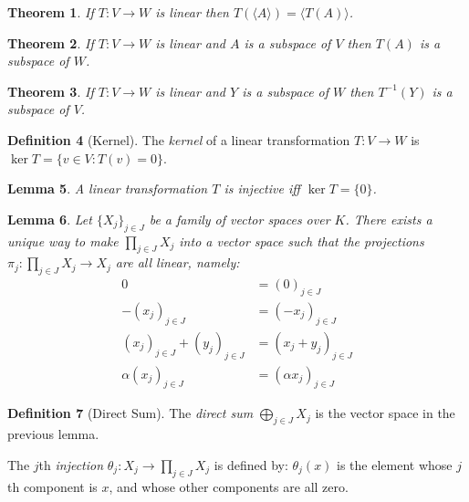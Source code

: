 \documentclass{book}
\newtheorem{lm}{Lemma}[chapter]
\newtheorem{thm}[lm]{Theorem}
\theoremstyle{definition}
\newtheorem{df}[lm]{Definition}
\newcommand{\inv}[1]{\ensuremath{{#1}^{-1}}}
\begin{document}
  \begin{thm}
    If $T : V \rightarrow W$ is linear then $T(\langle A \rangle) = \langle 
    T(A) 
    \rangle$.
  \end{thm}
  
  \begin{thm}
    If $T : V \rightarrow W$ is linear and $A$ is a subspace of $V$ then $T(A)$ 
    is a subspace of $W$.
  \end{thm}
  
  \begin{thm}
    If $T : V \rightarrow W$ is linear and $Y$ is a subspace of $W$ then 
    $\inv{T}(Y)$ is a subspace of $V$.
  \end{thm}
  
  \begin{df}[Kernel]
    The \emph{kernel} of a linear transformation $T : V \rightarrow W$ is $\ker 
    T 
    = \{ v \in V : T(v) = 0 \}$.
  \end{df}
  
  \begin{lm}
    \label{lm:linear:injective_kernel}
    A linear transformation $T$ is injective iff $\ker T = \{ 0 \}$.
  \end{lm}
  
  \begin{lm}
    Let $\{X_j\}_{j \in J}$ be a family of vector spaces over $K$. There exists 
    a 
    unique way to make $\prod_{j \in J} X_j$ into a vector space such that the 
    projections $\pi_j : \prod_{j \in J} X_j \rightarrow X_j$ are all linear, 
    namely:
    \begin{align*}
      0 & = (0)_{j \in J} \\
      -(x_j)_{j \in J} & = (-x_j)_{j \in J} \\
      (x_j)_{j \in J} + (y_j)_{j \in J} & = (x_j + y_j)_{j \in J} \\
      \alpha (x_j)_{j \in J} & = (\alpha x_j)_{j \in J}
    \end{align*}
  \end{lm}
  
  \begin{df}[Direct Sum]
    The \emph{direct sum} $\bigoplus_{j \in J} X_j$ is the vector space in the 
    previous lemma.
    
    The $j$th \emph{injection} $\theta_j : X_j \rightarrow \prod_{j \in J} X_j$ 
    is defined by: $\theta_j(x)$ is the element whose $j$th component is $x$, 
    and 
    whose other components are all zero.
  \end{df}
  
\end{document}

